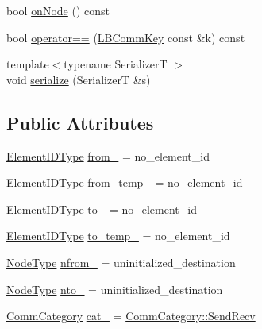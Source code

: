 \begin{DoxyCompactItemize}
\item 
bool \hyperlink{structvt_1_1vrt_1_1collection_1_1balance_1_1_l_b_comm_key_a6936fbd32052c703881774a5bdc4eec0}{on\+Node} () const
\item 
bool \hyperlink{structvt_1_1vrt_1_1collection_1_1balance_1_1_l_b_comm_key_ad3842428c1eb7648a07e5840c4d5b6c8}{operator==} (\hyperlink{structvt_1_1vrt_1_1collection_1_1balance_1_1_l_b_comm_key}{L\+B\+Comm\+Key} const \&k) const
\item 
{\footnotesize template$<$typename SerializerT $>$ }\\void \hyperlink{structvt_1_1vrt_1_1collection_1_1balance_1_1_l_b_comm_key_ac13d086d419525440a940292fa616d8c}{serialize} (SerializerT \&s)
\end{DoxyCompactItemize}
\subsection*{Public Attributes}
\begin{DoxyCompactItemize}
\item 
\hyperlink{namespacevt_1_1vrt_1_1collection_1_1balance_a14c8d2c972f2913aa3f1636e5be0a120}{Element\+I\+D\+Type} \hyperlink{structvt_1_1vrt_1_1collection_1_1balance_1_1_l_b_comm_key_a9bf6895070fbbce25ac12307bf606036}{from\+\_\+} = no\+\_\+element\+\_\+id
\item 
\hyperlink{namespacevt_1_1vrt_1_1collection_1_1balance_a14c8d2c972f2913aa3f1636e5be0a120}{Element\+I\+D\+Type} \hyperlink{structvt_1_1vrt_1_1collection_1_1balance_1_1_l_b_comm_key_add033f95cac2f80b6ccd8ae55e73dcfe}{from\+\_\+temp\+\_\+} = no\+\_\+element\+\_\+id
\item 
\hyperlink{namespacevt_1_1vrt_1_1collection_1_1balance_a14c8d2c972f2913aa3f1636e5be0a120}{Element\+I\+D\+Type} \hyperlink{structvt_1_1vrt_1_1collection_1_1balance_1_1_l_b_comm_key_a2bc95119b680d54a00881df2066b07d5}{to\+\_\+} = no\+\_\+element\+\_\+id
\item 
\hyperlink{namespacevt_1_1vrt_1_1collection_1_1balance_a14c8d2c972f2913aa3f1636e5be0a120}{Element\+I\+D\+Type} \hyperlink{structvt_1_1vrt_1_1collection_1_1balance_1_1_l_b_comm_key_a0bf597575c3107ee826fce4a631c5d06}{to\+\_\+temp\+\_\+} = no\+\_\+element\+\_\+id
\item 
\hyperlink{namespacevt_a866da9d0efc19c0a1ce79e9e492f47e2}{Node\+Type} \hyperlink{structvt_1_1vrt_1_1collection_1_1balance_1_1_l_b_comm_key_abc9aa99cd2f176756be39d326e808cbf}{nfrom\+\_\+} = uninitialized\+\_\+destination
\item 
\hyperlink{namespacevt_a866da9d0efc19c0a1ce79e9e492f47e2}{Node\+Type} \hyperlink{structvt_1_1vrt_1_1collection_1_1balance_1_1_l_b_comm_key_a3350377070bba8f2a4a4027d7b795543}{nto\+\_\+} = uninitialized\+\_\+destination
\item 
\hyperlink{namespacevt_1_1vrt_1_1collection_1_1balance_a9cc6c6884ca0416dae824e9204093c57}{Comm\+Category} \hyperlink{structvt_1_1vrt_1_1collection_1_1balance_1_1_l_b_comm_key_aa1d2709bdb4721255b0ac7ab7706ad31}{cat\+\_\+} = \hyperlink{namespacevt_1_1vrt_1_1collection_1_1balance_a9cc6c6884ca0416dae824e9204093c57a95aeb71ffd419cc14c6929f9dcd6cdff}{Comm\+Category\+::\+Send\+Recv}
\end{DoxyCompactItemize}



